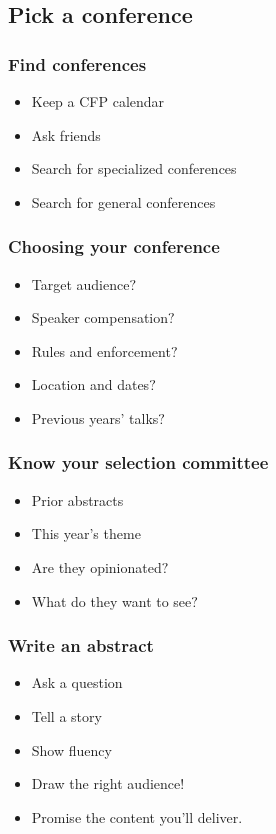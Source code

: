\documentclass{beamer}
\begin{document}
\subsection{Pick a conference}

\begin{frame}[fragile]
\frametitle{Find conferences}
\begin{itemize}[<+(1)->]
\item Keep a CFP calendar
\item Ask friends
\item Search for specialized conferences
\item Search for general conferences
\end{itemize}
\end{frame}

\begin{frame}[fragile]
\frametitle{Choosing your conference}
\begin{itemize}[<+(1)->]
\item Target audience$?$
\item Speaker compensation$?$
\item Rules and enforcement$?$
\item Location and dates$?$
\item Previous years' talks$?$
\end{itemize}
\end{frame}

\begin{frame}[fragile]
\frametitle{Know your selection committee}
\begin{itemize}[<+(1)->]
\item Prior abstracts
\item This year's theme
\item Are they opinionated$?$
\item What do they want to see$?$
\end{itemize}
\end{frame}

\begin{frame}[fragile]
\frametitle{Write an abstract}
\begin{itemize}[<+(1)->]
\item Ask a question
\item Tell a story
\item Show fluency
\item Draw the right audience!
\item Promise the content you'll deliver.
\end{itemize}
\end{frame}
\end{document}
